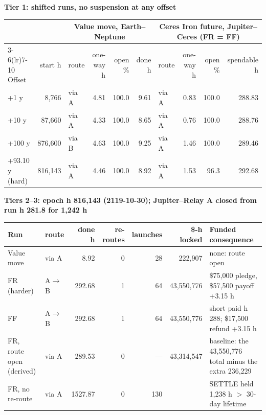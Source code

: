 \par\noindent\textbf{Tier 1: shifted runs, no suspension at any offset}\par
\setlength{\tabcolsep}{3pt}
\par\noindent
\begin{tabular}{lrlrrrlrrr}
\toprule
 & & \multicolumn{4}{c}{Value move, Earth--Neptune} & \multicolumn{4}{c}{Ceres Iron future, Jupiter--Ceres (FR = FF)}\\
\cmidrule(lr){3-6}\cmidrule(lr){7-10}
Offset & start h & route & one-way h & open \% & done h & route & one-way h & open \% & spendable h\\
\midrule
+1 y & 8{,}766 & via A & 4.81 & 100.0 & 9.61 & via A & 0.83 & 100.0 & 288.83\\
+10 y & 87{,}660 & via A & 4.33 & 100.0 & 8.65 & via A & 0.76 & 100.0 & 288.76\\
+100 y & 876{,}600 & via B & 4.63 & 100.0 & 9.25 & via A & 1.46 & 100.0 & 289.46\\
+93.10 y (hard) & 816{,}143 & via A & 4.46 & 100.0 & 8.92 & via A & 1.53 & 96.3 & 292.68\\
\bottomrule
\end{tabular}\par
\normalsize

\medskip
\par\noindent\textbf{Tiers 2--3: epoch h 816{,}143 (2119-10-30); Jupiter--Relay A closed from run h 281.8 for 1{,}242 h}\par
\setlength{\tabcolsep}{3pt}
\par\noindent
\begin{tabularx}{\linewidth}{llrrrr>{\raggedright\arraybackslash}X}
\toprule
Run & route & done h & re-routes & launches & \$-h locked & Funded consequence\\
\midrule
Value move & via A & 8.92 & 0 & 28 & 222{,}907 & none: route open\\
FR (harder) & A$\to$B & 292.68 & 1 & 64 & 43{,}550{,}776 & \$75{,}000 pledge, \$57{,}500 payoff +3.15 h\\
FF & A$\to$B & 292.68 & 1 & 64 & 43{,}550{,}776 & short paid h 288; \$17{,}500 refund +3.15 h\\
FR, route open (derived) & via A & 289.53 & 0 & --- & 43{,}314{,}547 & baseline: the 43{,}550{,}776 total minus the extra 236{,}229\\
FR, no re-route & via A & 1527.87 & 0 & 130 &  & SETTLE held 1{,}238 h $>$ 30-day lifetime\\
\bottomrule
\end{tabularx}\par

